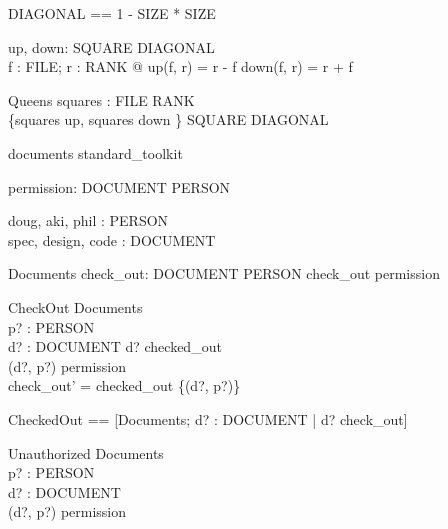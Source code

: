 \documentclass{llncs}
\begin{document}
\begin{zed}
DIAGONAL == 1 - SIZE  * SIZE
\end{zed}

\begin{axdef}
up, down: SQUARE \fun DIAGONAL\\
\where \forall f : FILE; r : RANK @ up(f, r) = r - f \land down(f, r)
= r + f
\end{axdef}

\begin{schema}{Queens}
squares : FILE \bij RANK \\
\where \{squares \dres up, squares \dres down \} \subseteq SQUARE
\inj DIAGONAL
\end{schema}



\begin{zsection}
\SECTION documents \parents standard\_toolkit
\end{zsection}

\begin{zed}
\end{zed}

\begin{axdef}
permission: DOCUMENT \rel PERSON
\end{axdef}

\begin{axdef}
doug, aki, phil : PERSON \\
spec, design, code : DOCUMENT
\end{axdef}

\begin{schema}{Documents}
check\_out: DOCUMENT \pfun PERSON
\where
check\_out \subseteq permission
\end{schema}

\begin{schema}{CheckOut}
\Delta Documents \\
p? : PERSON \\
d? : DOCUMENT
\where
d? \notin \dom checked\_out \\
(d?, p?) \in permission \\
check\_out' = checked\_out \cup \{(d?, p?)\}
\end{schema}

\begin{zed}
CheckedOut == [\Xi Documents; d? : DOCUMENT | d? \in \dom
check\_out]
\end{zed}

\begin{schema}{Unauthorized}
\Xi Documents \\
p? : PERSON \\
d? : DOCUMENT \\
\where (d?, p?) \notin permission
\end{schema}
\end{document}
